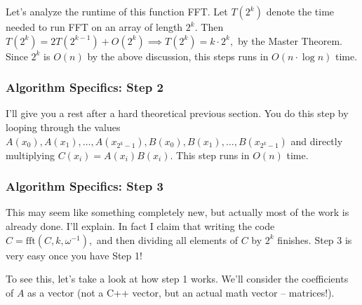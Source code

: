 Let's analyze the runtime of this function FFT. Let $T(2^k)$ denote the time needed to run FFT on an array of length $2^k.$ Then $T(2^k) = 2T(2^{k-1}) + O(2^k) \implies T(2^k) = k \cdot 2^k,$ by the Master Theorem. Since $2^k$ is $O(n)$ by the above discussion, this steps runs in $O(n \cdot \log n)$ time.

\subsubsection{Algorithm Specifics: Step 2}

I'll give you a rest after a hard theoretical previous section. You do this step by looping through the values $A(x_0), A(x_1), \dots, A(x_{2^k-1}), B(x_0), B(x_1), \dots, B(x_{2^k-1})$ and directly multiplying $C(x_i) = A(x_i)B(x_i).$ This step runs in $O(n)$ time.

\subsubsection{Algorithm Specifics: Step 3}

This may seem like something completely new, but actually most of the work is already done. I'll explain. In fact I claim that writing the code $C = \text{fft}(C, k, \omega^{-1}),$ and then dividing all elements of $C$ by $2^k$ finishes. Step 3 is very easy once you have Step 1!

To see this, let's take a look at how step 1 works. We'll consider the coefficients of $A$ as a vector (not a C++ vector, but an actual math vector -- matrices!).

